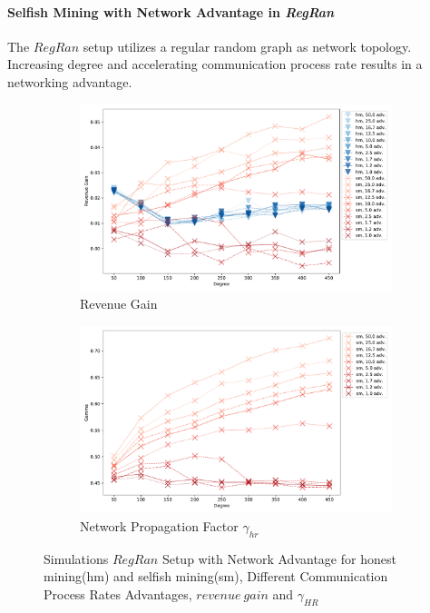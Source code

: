 \paragraph{Selfish Mining with Network Advantage in \textit{RegRan}}
The $RegRan$ setup utilizes a regular random graph as network topology. Increasing degree and accelerating communication process rate results in a networking advantage.
\begin{figure}[tbp]
	 \begin{subfigure}[b]{\textwidth}
		\includegraphics[width=\textwidth]{figures/sm_edge_new_revenue.pdf}
		\caption{Revenue Gain}
		\label{fig:sm_edge_rev}
	\end{subfigure}
	\hfill
	\begin{subfigure}[b]{\textwidth}
		\includegraphics[width=\textwidth]{figures/sm_edge_new_gamma.pdf}
		\caption{Network Propagation Factor $\gamma_{hr}$}
		\label{fig:sm_edge_gamma}
	\end{subfigure}
		\caption{Simulations $RegRan$ Setup with Network Advantage for honest mining(hm) and selfish mining(sm), Different Communication Process Rates Advantages, $revenue~gain$ and $\gamma_{HR}$}

\end{figure}

